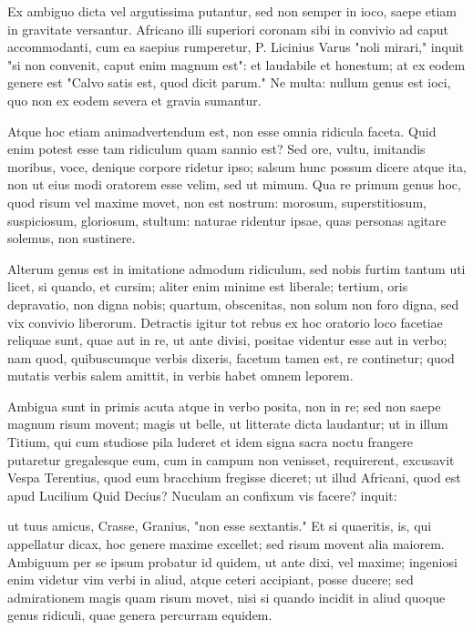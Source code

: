  Ex ambiguo dicta vel argutissima putantur, sed non semper in ioco, saepe etiam in gravitate versantur. Africano illi superiori coronam sibi in convivio ad caput accommodanti, cum ea saepius rumperetur, P. Licinius Varus "noli mirari," inquit "si non convenit, caput enim magnum est": et laudabile et honestum; at ex eodem genere est "Calvo satis est, quod dicit parum." Ne multa: nullum genus est ioci, quo non ex eodem severa et gravia sumantur.

 Atque hoc etiam animadvertendum est, non esse omnia ridicula faceta. Quid enim potest esse tam ridiculum quam sannio est? Sed ore, vultu, imitandis moribus, voce, denique corpore ridetur ipso; salsum hunc possum dicere atque ita, non ut eius modi oratorem esse velim, sed ut mimum. Qua re primum genus hoc, quod risum vel maxime movet, non est nostrum: morosum, superstitiosum, suspiciosum, gloriosum, stultum: naturae ridentur ipsae, quas personas agitare solemus, non sustinere.

 Alterum genus est in imitatione admodum ridiculum, sed nobis furtim tantum uti licet, si quando, et cursim; aliter enim minime est liberale; tertium, oris depravatio, non digna nobis; quartum, obscenitas, non solum non foro digna, sed vix convivio liberorum. Detractis igitur tot rebus ex hoc oratorio loco facetiae reliquae sunt, quae aut in re, ut ante divisi, positae videntur esse aut in verbo; nam quod, quibuscumque verbis dixeris, facetum tamen est, re continetur; quod mutatis verbis salem amittit, in verbis habet omnem leporem.

 Ambigua sunt in primis acuta atque in verbo posita, non in re; sed non saepe magnum risum movent; magis ut belle, ut litterate dicta laudantur; ut in illum Titium, qui cum studiose pila luderet et idem signa sacra noctu frangere putaretur gregalesque eum, cum in campum non venisset, requirerent, excusavit Vespa Terentius, quod eum bracchium fregisse diceret; ut illud Africani, quod est apud Lucilium Quid Decius? Nuculam an confixum vis facere? inquit:

 ut tuus amicus, Crasse, Granius, "non esse sextantis." Et si quaeritis, is, qui appellatur dicax, hoc genere maxime excellet; sed risum movent alia maiorem. Ambiguum per se ipsum probatur id quidem, ut ante dixi, vel maxime; ingeniosi enim videtur vim verbi in aliud, atque ceteri accipiant, posse ducere; sed admirationem magis quam risum movet, nisi si quando incidit in aliud quoque genus ridiculi, quae genera percurram equidem.

